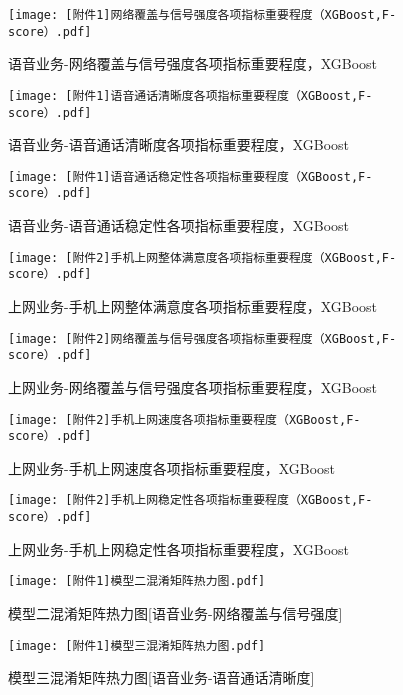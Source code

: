\documentclass{MathorCupmodeling}
\begin{document}
	\begin{figure}[H]
		\centerline{\texttt{[image: [附件1]网络覆盖与信号强度各项指标重要程度（XGBoost,F-score）.pdf]}}
		\caption{语音业务-网络覆盖与信号强度各项指标重要程度，XGBoost}\label{fig:a1SecondXGBoost}
	\end{figure}
	\begin{figure}[H]
		\centerline{\texttt{[image: [附件1]语音通话清晰度各项指标重要程度（XGBoost,F-score）.pdf]}}
		\caption{语音业务-语音通话清晰度各项指标重要程度，XGBoost}\label{fig:a1ThirdXGBoost}
	\end{figure}
	\begin{figure}[H]
		\centerline{\texttt{[image: [附件1]语音通话稳定性各项指标重要程度（XGBoost,F-score）.pdf]}}
		\caption{语音业务-语音通话稳定性各项指标重要程度，XGBoost}\label{fig:a1FourthXGBoost}
	\end{figure}
	\begin{figure}[H]
		\centerline{\texttt{[image: [附件2]手机上网整体满意度各项指标重要程度（XGBoost,F-score）.pdf]}}
		\caption{上网业务-手机上网整体满意度各项指标重要程度，XGBoost}\label{fig:a2FirstXGBoost}
	\end{figure}
	\begin{figure}[H]
		\centerline{\texttt{[image: [附件2]网络覆盖与信号强度各项指标重要程度（XGBoost,F-score）.pdf]}}
		\caption{上网业务-网络覆盖与信号强度各项指标重要程度，XGBoost}\label{fig:a2SecondXGBoost}
	\end{figure}
	\begin{figure}[H]
		\centerline{\texttt{[image: [附件2]手机上网速度各项指标重要程度（XGBoost,F-score）.pdf]}}
		\caption{上网业务-手机上网速度各项指标重要程度，XGBoost}\label{fig:a2ThirdXGBoost}
	\end{figure}
	\begin{figure}[H]
		\centerline{\texttt{[image: [附件2]手机上网稳定性各项指标重要程度（XGBoost,F-score）.pdf]}}
		\caption{上网业务-手机上网稳定性各项指标重要程度，XGBoost}\label{fig:a2FourthXGBoost}
	\end{figure}
	\begin{figure}[H]
		\centerline{\texttt{[image: [附件1]模型二混淆矩阵热力图.pdf]}}
		\caption{模型二混淆矩阵热力图[语音业务-网络覆盖与信号强度]}\label{fig:SecondModelConfusionMatrix}
	\end{figure}
	\begin{figure}[H]
		\centerline{\texttt{[image: [附件1]模型三混淆矩阵热力图.pdf]}}
		\caption{模型三混淆矩阵热力图[语音业务-语音通话清晰度]}\label{fig:ThirdModelConfusionMatrix}
	\end{figure}
\end{document}
